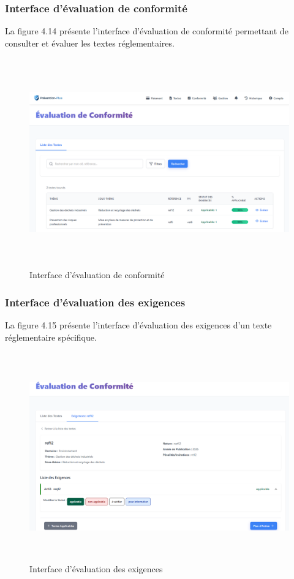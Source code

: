 \subsubsection{Interface d'évaluation de conformité}
\noindent La figure 4.14 présente l'interface d'évaluation de conformité permettant de consulter et évaluer les textes réglementaires.

\begin{figure}[H]
    \centering
    \includegraphics[width=14cm,height=9cm]{images/complianceinterface.PNG}
    \caption{Interface d'évaluation de conformité}
\end{figure}

\subsubsection{Interface d'évaluation des exigences}
\noindent La figure 4.15 présente l'interface d'évaluation des exigences d'un texte réglementaire spécifique.

\begin{figure}[H]
    \centering
    \includegraphics[width=14cm,height=9cm]{images/requirementevaluation.PNG}
    \caption{Interface d'évaluation des exigences}
\end{figure}

